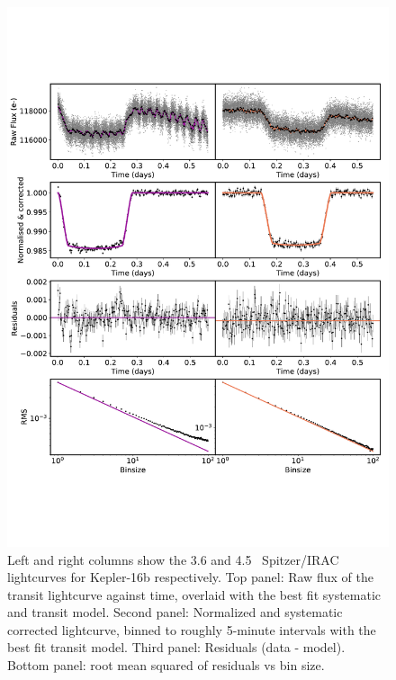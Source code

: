 \begin{figure}
    \centering
    \includegraphics[width = \linewidth, trim={0 4cm 0 4cm},clip]{Kepler16b_lc.pdf}
    \caption{Left and right columns show the 3.6 and 4.5\um~ Spitzer/IRAC lightcurves for Kepler-16b respectively. Top panel: Raw flux of the transit lightcurve against time, overlaid with the best fit systematic and transit model. Second panel: Normalized and systematic corrected lightcurve, binned to roughly 5-minute intervals with the best fit transit model. Third panel: Residuals (data - model). Bottom panel: root mean squared of residuals vs bin size.}
    \label{P4:fig:k16blc}
\end{figure}

